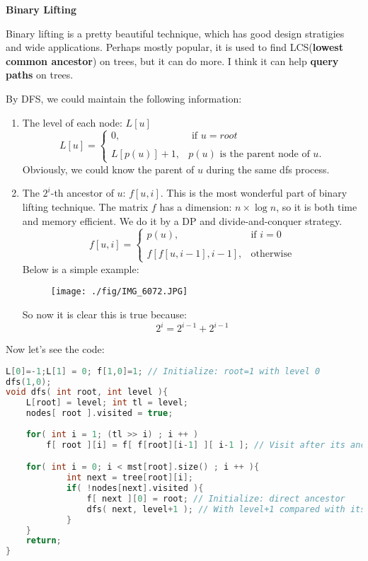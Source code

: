 \documentclass[a4 paper]{article}
\begin{document}
\begin{center}
	\huge\bf Binary Lifting
\end{center}

Binary lifting is a pretty beautiful technique, which has good design stratigies and wide applications. Perhaps mostly popular, it is used to find LCS({\bf lowest common ancestor}) on trees, but it can do more. I think it can help {\bf query paths} on trees.

By DFS, we could maintain the following information:
\begin{enumerate}[(1)]
	\item The level of each node: $L[u]$
	\[
		L[u] = \left\{
			\begin{array}{ll}
			0,&\text{ if }u=root\\
			\\
			L[p(u)]+1,& p(u) \text{ is the parent node of }u.
			\end{array}
		\right.
	\]
	Obviously, we could know the parent of $u$ during the same dfs process.
	\item The $2^i$-th ancestor of $u$: $f[u,i]$. This is the most wonderful part of binary lifting technique. The matrix $f$ has a dimension: $n\times \log n$, so it is both time and memory efficient. We do it by a DP and divide-and-conquer strategy.
	\[
		f[u,i] = \left\{
			\begin{array}{ll}
				p(u),& \text{if }i=0\\
				\\
				f\left[ f[u,i-1],i-1 \right], &\text{otherwise}
			\end{array}
		\right.
	\] 
	Below is a simple example:
	\begin{figure}[!ht]
		\centering
		\texttt{[image: ./fig/IMG\_6072.JPG]}
	\end{figure}
	
	So now it is clear this is true because:
	\[ 2^{i} = 2^{i-1}+2^{i-1} \]
\end{enumerate}
Now let's see the code:
\begin{lstlisting}[language=C++]
L[0]=-1;L[1] = 0; f[1,0]=1; // Initialize: root=1 with level 0 
dfs(1,0);
void dfs( int root, int level ){
	L[root] = level; int tl = level; 
	nodes[ root ].visited = true; 
	
	for( int i = 1; (tl >> i) ; i ++ )
		f[ root ][i] = f[ f[root][i-1] ][ i-1 ]; // Visit after its ancestors have been visited.

	for( int i = 0; i < mst[root].size() ; i ++ ){
			int next = tree[root][i];
			if( !nodes[next].visited ){
				f[ next ][0] = root; // Initialize: direct ancestor 
				dfs( next, level+1 ); // With level+1 compared with its parent
			}
	}
	return;
}
\end{lstlisting}
\end{document}
